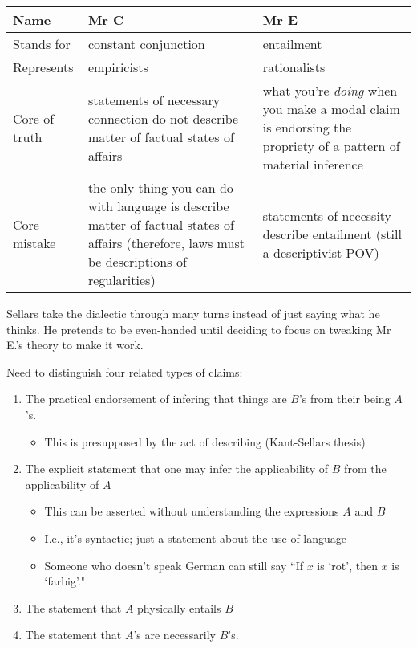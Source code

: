 \begin{table}[]
\begin{tabular}{|l|l|l|}
\hline
Name & Mr C &  Mr E\\ \hline
Stands for & constant conjunction & entailment \\ \hline
Represents & empiricists &  rationalists\\ \hline
Core of truth &  statements of necessary connection do not describe matter of factual states of affairs & what you're \emph{doing} when you make a modal claim is endorsing the propriety of a pattern of material inference \\ \hline
Core mistake & the only thing you can do with language is describe matter of factual states of affairs (therefore, laws must be descriptions of regularities) & statements of necessity describe entailment (still a descriptivist POV) \\ \hline
\end{tabular}
\caption{}
\label{tab:mrdebate}
\end{table}

Sellars take the dialectic through many turns instead of just saying what he thinks. He pretends to be even-handed until deciding to focus on tweaking Mr E.'s theory to make it work.

Need to distinguish four related types of claims:
\begin{enumerate}
\item The practical endorsement of infering that things are $B$'s from their being $A$'s. \begin{itemize}
\item This is presupposed by the act of describing (Kant-Sellars thesis)
\end{itemize}
\item The explicit statement that one may infer the applicability of $B$ from the applicability of $A$ \begin{itemize}
\item This can be asserted without understanding the expressions $A$ and $B$
\item I.e., it's syntactic; just a statement about the use of language
\item Someone who doesn't speak German can still say ``If $x$ is `rot', then $x$ is `farbig'."
\end{itemize}
\item The statement that $A$ physically entails $B$
\item The statement that $A$'s are necessarily $B$'s.
\end{enumerate}

